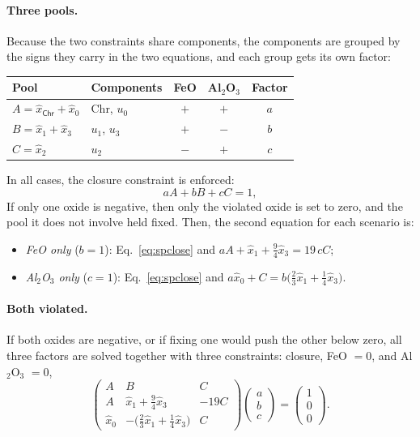 \paragraph{Three pools.} Because the two constraints share components, the components are
grouped by the signs they carry in the two equations, and each group gets its own factor:
\begin{center}
\begin{tabular}{@{}l l c c c@{}}
\toprule
Pool & Components & FeO & Al$_2$O$_3$ & Factor \\
\midrule
$A = \hat x_{\mathsf{Chr}} + \hat x_0$ & Chr, $u_0$ & $+$ & $+$ & $a$ \\
$B = \hat x_1 + \hat x_3$         & $u_1$, $u_3$ & $+$ & $-$ & $b$ \\
$C = \hat x_2$                    & $u_2$ & $-$ & $+$ & $c$ \\
\bottomrule
\end{tabular}
\end{center}
In all cases, the closure constraint is enforced:
\begin{equation}
  aA + bB + cC = 1, \label{eq:spclose}
\end{equation}
If only one oxide is negative, then only the violated oxide is set to zero, 
and the pool it does not involve held fixed.
Then, the second equation for each scenario is:
\begin{itemize}[nosep]
  \item \emph{FeO only} ($b = 1$): Eq.~\eqref{eq:spclose} and
        $aA + \hat x_1 + \tfrac94\hat x_3 = 19\,cC$;
  \item \emph{Al$_2$O$_3$ only} ($c = 1$): Eq.~\eqref{eq:spclose} and
        $a\hat x_0 + C = b\big(\tfrac23\hat x_1 + \tfrac14\hat x_3\big)$.
\end{itemize}

\paragraph{Both violated.} If both oxides are negative, or if fixing one would push the other
below zero, all three factors are solved together with three constraints: closure, FeO $= 0$, and
Al$_2$O$_3$ $= 0$,
\begin{equation}
  \begin{pmatrix}
    A & B & C\\
    A & \hat x_1 + \tfrac94\hat x_3 & -19C\\
    \hat x_0 & -\big(\tfrac23\hat x_1 + \tfrac14\hat x_3\big) & C
  \end{pmatrix}
  \begin{pmatrix} a\\ b\\ c \end{pmatrix}
  =
  \begin{pmatrix} 1\\ 0\\ 0 \end{pmatrix}.
\end{equation}

